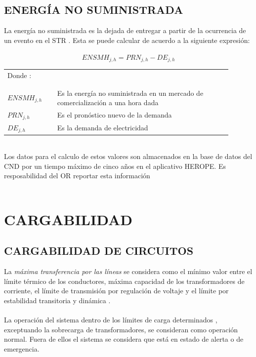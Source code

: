 \documentclass[a5paper]{book}%
\begin{document}
  \section{ENERGÍA NO SUMINISTRADA}

  La energía no suministrada es la dejada de entregar a partir de la
  ocurrencia de un evento en el \ac{STR} \cite{CREG0152018}. Esta se
  puede calcular de acuerdo a la siguiente expresión: \cite{CREG0942012}\\\\

  \[ ENSMH_{j,h} = PRN_{j,h} - DE_{j,h} \]

  \begin{tabular}{p{0.2\linewidth} p{0.7\linewidth}}
    Donde :\\\\& \\
    $ENSMH_{j,h}$& Es la energía no suministrada en  un mercado de comercialización a una hora dada \\
    $PRN_{j,h}$ & Es el pronóstico nuevo de la demanda\\
    $DE_{j,h}$ & Es la demanda de electricidad \\
  \end{tabular}\\

  
\hspace{1cm}
  Los datos para el calculo de estos valores son almacenados en la
  base de datos del CND por un tiempo máximo de cinco años en el
  aplicativo HEROPE. Es resposabilidad del OR reportar esta
  información\\\\
  
\chapter{CARGABILIDAD}
\section{CARGABILIDAD DE CIRCUITOS}
 La \textit{máxima transferencia por las líneas} se considera
  como el mínimo valor entre el límite térmico de los conductores,
  máxima capacidad de los transformadores de corriente, el límite de
  transmisión por regulación de voltaje y el límite por estabilidad
  transitoria y dinámica \cite{CREG0251995}.\\\\

  La operación del sistema dentro de los límites de carga
  determinados , exceptuando la sobrecarga de
  transformadores, se consideran como operación normal. Fuera de ellos
  el sistema se considera que está en estado de alerta o de
  emergencia.\\\\
  
\end{document}
